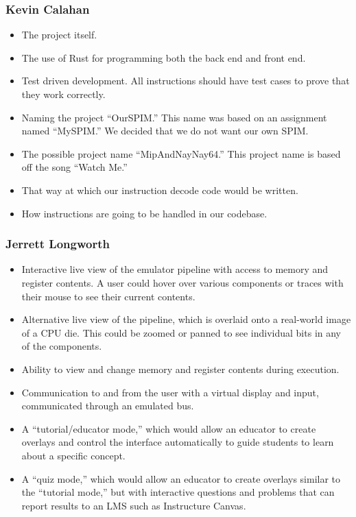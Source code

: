 \documentclass[
    paper=letter,
    parskip=half,
    fontsize=12pt,
    titlepage=firstiscover,
    toc=bibliography,
    numbers=endperiod
]{scrartcl}
\begin{document}
\subsubsection{Kevin Calahan}
\begin{itemize}
    \item The project itself.
    \item The use of Rust for programming both the back end and front end.
    \item Test driven development. All instructions should have test cases to
          prove that they work correctly.
    \item Naming the project “OurSPIM.” This name was based on an assignment named
          “MySPIM.” We decided that we do not want our own SPIM.
    \item The possible project name “MipAndNayNay64.” This project name is based
          off the song “Watch Me.”
    \item That way at which our instruction decode code would be written.
    \item How instructions are going to be handled in our codebase.
\end{itemize}

\subsubsection{Jerrett Longworth}
\begin{itemize}
    \item Interactive live view of the emulator pipeline with access to memory and
          register contents. A user could hover over various components or traces
          with their mouse to see their current contents.
    \item Alternative live view of the pipeline, which is overlaid onto a
          real-world image of a CPU die. This could be zoomed or panned to see
          individual bits in any of the components.
    \item Ability to view and change memory and register contents during
          execution.
    \item Communication to and from the user with a virtual display and input,
          communicated through an emulated bus.
    \item A “tutorial/educator mode,” which would allow an educator to create
          overlays and control the interface automatically to guide students to
          learn about a specific concept.
    \item A “quiz mode,” which would allow an educator to create overlays similar
          to the “tutorial mode,” but with interactive questions and problems that
          can report results to an LMS such as Instructure Canvas.
\end{itemize}
\end{document}

